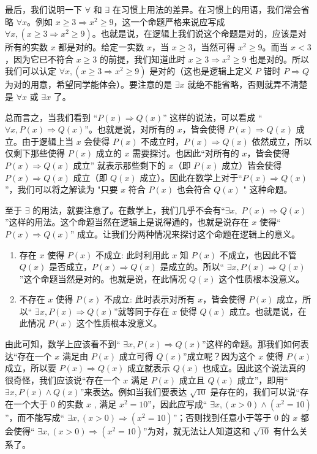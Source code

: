 最后，我们说明一下 \(\forall\) 和 \(\exists\) 在习惯上用法的差异。在习惯上的用语，我们常会省略 \(\forall x\)。例如 \(x \ge 3 \Rightarrow x^2 \ge 9\)，这一个命题严格来说应写成 \(\forall x, (x \ge 3 \Rightarrow x^2 \ge 9)\)。也就是说，在逻辑上我们说这个命题是对的，应该是对所有的实数 \(x\) 都是对的。给定一实数 \(x\)，当 \(x \ge 3\)，当然可得 \(x^2 \ge 9\)。而当 \(x < 3\)，因为它已不符合 \(x \ge 3\) 的前提，我们知道此时 \(x \ge 3 \Rightarrow x^2 \ge 9\) 也是对的。所以我们可以认定 \(\forall x, (x \ge 3 \Rightarrow x^2 \ge 9)\) 是对的（这也是逻辑上定义 \(P\) 错时 \(P \Rightarrow Q\) 为对的用意，希望同学能体会）。要注意的是 \(\exists x\) 就绝不能省略，否则就弄不清楚是 \(\forall x\) 或 \(\exists x\) 了。

总而言之，当我们看到 “\( P(x) \Rightarrow Q(x) \)” 这样的说法，可以看成 “\( \forall x, P(x) \Rightarrow Q(x)\)”。也就是说，对所有的 \(x\)，皆会使得 \(P(x) \Rightarrow Q(x)\) 成立。由于逻辑上当 \(x\) 会使得 \(P(x)\) 不成立时，\(P(x) \Rightarrow Q(x)\) 依然成立，所以仅剩下那些使得 \(P(x)\) 成立的 \(x\) 需要探讨。也因此“对所有的 \(x\)，皆会使得 \(P(x) \Rightarrow Q(x)\) 成立” 就表示那些剩下的 \(x\)（即 \(P(x)\) 成立）皆会使得 \(P(x) \Rightarrow Q(x)\) 成立（即 \(Q(x)\) 成立）。因此在数学上对于“\( P(x) \Rightarrow Q(x) \)”，我们可以将之解读为 "只要 \(x\) 符合 \(P(x)\) 也会符合 \(Q(x)\) " 这种命题。

至于 \(\exists\) 的用法，就要注意了。在数学上，我们几乎不会有“$\exists x,$ $ P(x) \Rightarrow Q(x)$”这样的用法。这个命题当然在逻辑上是说得通的，也就是说存在 \(x\) 使得“\(P(x) \Rightarrow Q(x)\)” 成立。让我们分两种情况来探讨这个命题在逻辑上的意义。

\begin{enumerate}
    \item 存在 \(x\) 使得 \(P(x)\) 不成立: 此时利用此 \(x\) 知 \(P(x)\) 不成立，也因此不管 \(Q(x)\) 是否成立，\(P(x) \Rightarrow Q(x)\) 是成立的。所以“ \(\exists x, P(x) \Rightarrow Q(x)\)”这个命题当然是对的。也就是说，在此情况 \(Q(x)\) 这个性质根本没意义。
    \item 不存在 \(x\) 使得 \(P(x)\) 不成立: 此时表示对所有 \(x\)，皆会使得 \(P(x)\) 成立，所以“ \(\exists x, P(x) \Rightarrow Q(x)\)”就等同于存在 \(x\) 使得 \(Q(x)\) 成立。也就是说，在此情况 \(P(x)\) 这个性质根本没意义。
\end{enumerate}

由此可知，数学上应该看不到“ \(\exists x, P(x) \Rightarrow Q(x)\)”这样的命题。那我们如何表达“存在一个 \(x\) 满足由 \(P(x)\) 成立可得 \(Q(x)\)”成立呢？因为这个 \(x\) 使得 \(P(x)\) 成立，所以要 \(P(x) \Rightarrow Q(x)\) 成立就表示 \(Q(x)\) 也成立。因此这个说法真的很奇怪，我们应该说“存在一个 \(x\) 满足 \(P(x)\) 成立且 \(Q(x)\) 成立”，即用“ \(\exists x, P(x) \land Q(x)\)”来表达。例如当我们要表达 \(\sqrt{10}\) 是存在的，我们可以说“存在一个大于 0 的实数 \(x\) , 满足 \(x^2 = 10\)”，因此应写成“ \(\exists x, (x > 0) \land (x^2 = 10)\)”，而不能写成“ \(\exists x, (x > 0) \Rightarrow (x^2 = 10)\)”；否则找到任意小于等于 0 的 \(x\) 都会使得“ \(\exists x, (x > 0) \Rightarrow (x^2 = 10)\)”为对，就无法让人知道这和 \(\sqrt{10}\) 有什么关系了。


